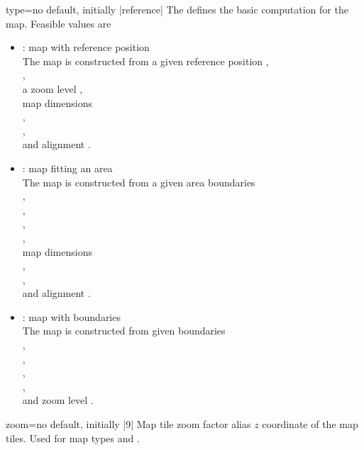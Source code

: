 \begin{docMrcKey}[supply]{type}{=}{no default, initially |reference|}
  The  defines the basic computation for the map. Feasible values are
  \begin{itemize}
  \item{}: \flqq map with reference position\frqq\\
    The map is constructed from a given reference position
    ,\\
    ,\\
    a zoom level ,\\
    map dimensions\\
    ,\\
    ,\\
    and alignment .
  \item{}: \flqq map fitting an area\frqq\\
    The map is constructed from a given area boundaries\\
    ,\\
    ,\\
    ,\\
    ,\\
    map dimensions\\
    ,\\
    ,\\
    and alignment .
  \item{}: \flqq map with boundaries\frqq\\
    The map is constructed from given boundaries\\
    ,\\
    ,\\
    ,\\
    ,\\
    and zoom level .
  \end{itemize}
\end{docMrcKey}

\pagebreak

\begin{docMrcKey}[supply]{zoom}{=}{no default, initially |9|}
  Map tile zoom factor alias $z$ coordinate of the map tiles.
  Used for map types  and .
\end{docMrcKey}

